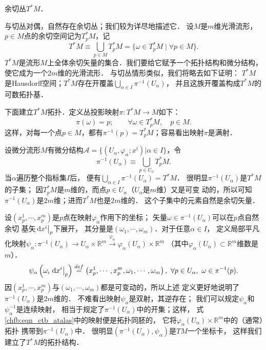 \begin{example}\label{chfb:exm_ctb}
    余切丛$T^* M$．
\end{example}
与切丛对偶，自然存在余切丛；我们较为详尽地描述它．
设$M$是$m$维光滑流形，$p\in M$点的余切空间记为$T_p^* M$，记
\begin{equation}\label{chfb:eqn_cotangent-bundle-set}
    T^* M \equiv \bigcup _{p\in M} T_p^* M = \{\omega \in T_p^* M \mid \forall p\in M\} .
\end{equation}
$T^*M$是流形$M$上全体余切矢量的集合．我们要给它赋予一个拓扑结构和微分结构，使它成为一个$2m$维的光滑流形．
与切丛情形类似，我们将略去如下证明：
$T^*M$是Hausdorff空间；$T^*M$存在开覆盖$\bigcup _{\alpha\in I} \pi^{-1} (U_\alpha)$，
并且这族开覆盖构成$T^*M$的可数拓扑基．

下面建立$T^*M$拓扑．定义丛投影映射$\pi:T^*M\to M$如下：
\begin{equation*}
    \pi(\omega) = p; \qquad \forall \omega \in T_p^* M,\quad p\in M.
\end{equation*}
这样，对每一个点$p\in M$，都有$\pi^{-1}(p)=T_p^* M$；容易看出映射$\pi$是满射．

设微分流形$M$有微分结构$\mathscr{A}=\{(U_\alpha,\varphi_\alpha;x^i)|\alpha \in I \}$，令
\begin{equation*}
    \pi^{-1} (U_\alpha) \equiv \bigcup _{p\in U_\alpha} T_p^*M .
\end{equation*}
当$\alpha$遍历整个指标集$I$后，
便有$\bigcup _{\alpha \in I}  \pi^{-1} (U_\alpha) = T^*M$．
很明显$\pi^{-1} (U_\alpha)$是$T^*M$的子集；
因$T^*_pM$是$m$维的，而点$p\in U_\alpha$（$U_\alpha$是$m$维）又是可变
动的，所以可知$\pi^{-1} (U_\alpha)$是$2m$维；进而$T^*M$也是$2m$维的．
这个子集中的元素自然是余切矢量．

设$(x_p^1,\cdots,x_p^m)$是$p$点在映射$\varphi_\alpha$作用下的坐标；
矢量$\omega \in \pi^{-1} (U_\alpha)$可以在$p$点自然余切
基矢$\left.{\rm d}x^i \right | _p$下展开，
其分量是$(\omega_1,\cdots,\omega_m)$．对于任意$\alpha \in I$，
定义局部平凡化映射$\psi_\alpha: \pi^{-1} (U_\alpha) \to U_\alpha \times \mathbb{R}^m 
\overset{\varphi_\alpha}{\longrightarrow} \varphi_\alpha(U_\alpha) \times \mathbb{R}^m $
（其中$\varphi_\alpha(U_\alpha) \subset \mathbb{R}^m$维数是$m$）．
\begin{equation}\label{chfb:eqn_ctb_atalas}
    \psi_\alpha\left(\omega_i \left. {\rm d}x^i \right| _p \right) \overset{def}{=} 
    \left(x_p^1,\cdots,x_p^m, \omega_1,\cdots,\omega_m\right),
    \ \forall p\in U_\alpha,\ \omega\in \pi^{-1} (p).
\end{equation}
因$(x_p^1,\cdots,x_p^m)$与$(\omega_1,\cdots,\omega_m)$都是可变动的，所以上述
定义更好地说明了$\pi^{-1} (U_\alpha)$是$2m$维的．
不难看出映射$\psi_\alpha$是双射，其逆存在；
我们可以规定$\psi_\alpha$和$\psi_\alpha^{-1}$是连续映射，
相当于规定了$\pi^{-1} (U_\alpha)$中的开集；这样，
式\eqref{chfb:eqn_ctb_atalas}中的映射便是拓扑同胚的，
它将$\varphi_\alpha(U_\alpha) \times \mathbb{R}^m $中的（通常）拓扑
携带到$\pi^{-1} (U_\alpha)$中．
很明显$(\pi^{-1} (U_\alpha),\psi_\alpha)$是$TM$一个坐标卡，
这样我们建立了$T^*M$的拓扑结构．


